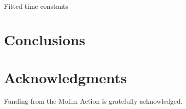 \documentclass[twoside,twocolumn,9pt]{article}
\begin{document}
Fitted time constants


\section{Conclusions}
 

\section*{Acknowledgments}
Funding from the Molim Action is gratefully acknowledged.






\end{document}

